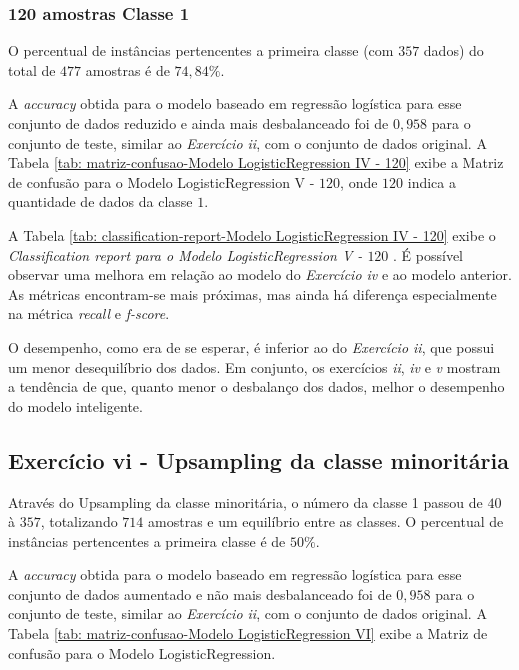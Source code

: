 

\subsubsection{120 amostras Classe 1}

O percentual de instâncias pertencentes a primeira classe (com $357$ dados) do total de $477$ amostras é de $74,84\%$.

A \textit{accuracy} obtida para o modelo baseado em regressão logística para esse conjunto de dados reduzido e ainda mais desbalanceado foi de $0,958$ para o conjunto de teste, similar ao \textit{Exercício ii}, com o conjunto de dados original. A Tabela \ref{tab: matriz-confusao-Modelo LogisticRegression IV - 120} exibe a Matriz de confusão para o Modelo LogisticRegression V - $120$, onde $120$ indica a quantidade de dados da classe $1$.



A Tabela \ref{tab: classification-report-Modelo LogisticRegression IV - 120} exibe o \textit{Classification report para o Modelo LogisticRegression V - $120$ }. É possível observar uma melhora em relação ao modelo do \textit{Exercício iv} e ao modelo anterior. As métricas encontram-se mais próximas, mas ainda há diferença especialmente na métrica \textit{recall} e \textit{f-score}.



O desempenho, como era de se esperar, é inferior ao do \textit{Exercício ii}, que possui um menor desequilíbrio dos dados. Em conjunto, os exercícios \textit{ii}, \textit{iv} e \textit{v} mostram a tendência de que, quanto menor o desbalanço dos dados, melhor o desempenho do modelo inteligente.

\subsection{Exercício vi - Upsampling da classe minoritária}

Através do Upsampling da classe minoritária, o número da classe 1 passou de $40$ à $357$, totalizando $714$ amostras e um equilíbrio entre as classes. O percentual de instâncias pertencentes a primeira classe é de $50\%$.

A \textit{accuracy} obtida para o modelo baseado em regressão logística para esse conjunto de dados aumentado e não mais desbalanceado foi de $0,958$ para o conjunto de teste, similar ao \textit{Exercício ii}, com o conjunto de dados original. A Tabela \ref{tab: matriz-confusao-Modelo LogisticRegression VI} exibe a Matriz de confusão para o Modelo LogisticRegression.

